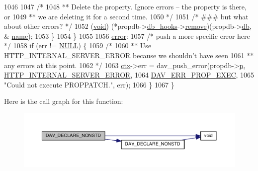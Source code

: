 \begin{DoxyCode}
1046 
1047             \textcolor{comment}{/*}
1048 \textcolor{comment}{            ** Delete the property. Ignore errors -- the property is there, or}
1049 \textcolor{comment}{            ** we are deleting it for a second time.}
1050 \textcolor{comment}{            */}
1051             \textcolor{comment}{/* ### but what about other errors? */}
1052             (\hyperlink{group__MOD__ISAPI_gacd6cdbf73df3d9eed42fa493d9b621a6}{void}) (*propdb->\hyperlink{structdav__propdb_a1e52f1dc673f63827c00e13a651329f3}{db\_hooks}->\hyperlink{structdav__hooks__propdb_a9aefad972daa1f480c897101d10a6b86}{remove})(propdb->\hyperlink{structdav__propdb_a49ea8f1bcbc105b8ce0b9b79707cb2d7}{db}, &
      \hyperlink{group__APACHE__CORE__CONFIG_ga06e97fb366205b8f170da3c7562a8677}{name});
1053         \}
1054     \}
1055 
1056   \hyperlink{group__APACHE__CORE__PROTO_ga11614f44ef4d939bdd984953346a7572}{error}:
1057     \textcolor{comment}{/* push a more specific error here */}
1058     \textcolor{keywordflow}{if} (err != \hyperlink{pcre_8txt_ad7f989d16aa8ca809a36bc392c07fba1}{NULL}) \{
1059         \textcolor{comment}{/*}
1060 \textcolor{comment}{        ** Use HTTP\_INTERNAL\_SERVER\_ERROR because we shouldn't have seen}
1061 \textcolor{comment}{        ** any errors at this point.}
1062 \textcolor{comment}{        */}
1063         \hyperlink{group__APACHE__CORE__FILTER_ga94af791485570bea922969fef12d6259}{ctx}->err = dav\_push\_error(propdb->\hyperlink{structdav__propdb_a6973ecc8f81aff87c31f924840e492b7}{p}, \hyperlink{group__HTTP__Status_ga5d9777e02c26063c2985e39ef71091d2}{HTTP\_INTERNAL\_SERVER\_ERROR},
1064                                   \hyperlink{group__MOD__DAV_ga4a45bc2660feae1f83923f334e7789d9}{DAV\_ERR\_PROP\_EXEC},
1065                                   \textcolor{stringliteral}{"Could not execute PROPPATCH."}, err);
1066     \}
1067 \}
\end{DoxyCode}


Here is the call graph for this function\+:
\nopagebreak
\begin{figure}[H]
\begin{center}
\leavevmode
\includegraphics[width=350pt]{group__MOD__DAV_gae0020162c35067f4596472c03dfe81c4_cgraph}
\end{center}
\end{figure}


